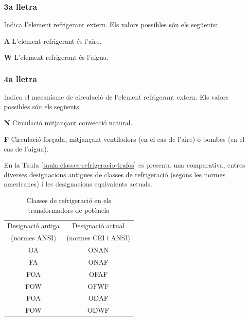 \subsubsection*{3a lletra}
 Indica l'element refrigerant extern. Els valors
possibles s\'{o}n els seg\"{u}ents:
\begin{list}{}
   {\setlength{\labelwidth}{10mm} \setlength{\leftmargin}{10mm} \setlength{\labelsep}{2mm}}
   \item[\textbf{A}] L'element refrigerant \'{e}s l'aire.
   \item[\textbf{W}] L'element refrigerant \'{e}s l'aigua.
\end{list}
 

\subsubsection*{4a lletra}
 Indica el mecanisme de circulaci\'{o} de l'element
refrigerant extern. Els valors possibles s\'{o}n els seg\"{u}ents:
\begin{list}{}
   {\setlength{\labelwidth}{10mm} \setlength{\leftmargin}{10mm} \setlength{\labelsep}{2mm}}
   \item[\textbf{N}] Circulaci\'{o} mitjan\c{c}ant convecci\'{o} natural.
   \item[\textbf{F}] Circulaci\'{o} for\c{c}ada, mitjan\c{c}ant ventiladors (en el cas de
   l'aire) o bombes (en el cas de l'aigua).
\end{list}
 

En la Taula \vref{taula:classes-refrigeracio-trafos} es presenta una
comparativa, entres diverses designacions antigues de classes de
refrigeraci\'{o} (segons les normes americanes) i les designacions
equivalents actuals.

\begin{table}[h]
   \caption{\label{taula:classes-refrigeracio-trafos}
   Classes de refrigeraci\'{o} en els transformadors de pot\`{e}ncia}
   \begin{center}\begin{tabular}{cc}
   \toprule[1pt]
   Designaci\'{o} antiga & Designaci\'{o} actual \\
   (normes \textsf{\textsf{ANSI}})     & (normes \textsf{\textsf{CEI}} i
   \textsf{\textsf{ANSI}}) \\
   \midrule
   OA & ONAN   \\
   FA & ONAF   \\
   FOA & OFAF  \\
   FOW & OFWF  \\
   FOA & ODAF  \\
   FOW & ODWF \\
   \bottomrule[1pt]
   \end{tabular} \end{center}
\end{table}


